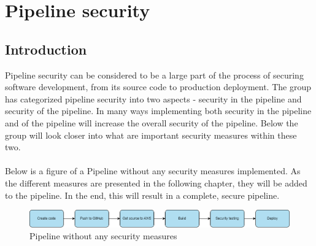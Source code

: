 \chapter{Pipeline security}
\section{Introduction}
Pipeline security can be considered to be a large part of the process of securing software development, from its source code to production deployment. The group has categorized pipeline security into two aspects - security in the pipeline and security of the pipeline. In many ways implementing both security in the pipeline and of the pipeline will increase the overall security of the pipeline. Below the group will look closer into what are important security measures within these two. 
\\~\\
Below is a figure of a \gls{Pipeline} without any security measures implemented. As the different measures are presented in the following chapter, they will be added to the pipeline. In the end, this will result in a complete, secure pipeline.

\vspace{2mm}
\begin{figure}[H]
    \centering
    \includegraphics[width=0.8\columnwidth]{Images/SecurePipeline-Page-3.drawio.png}
    \caption{Pipeline without any security measures}
    \label{fig: Pipeline without any security measures}
\end{figure}



